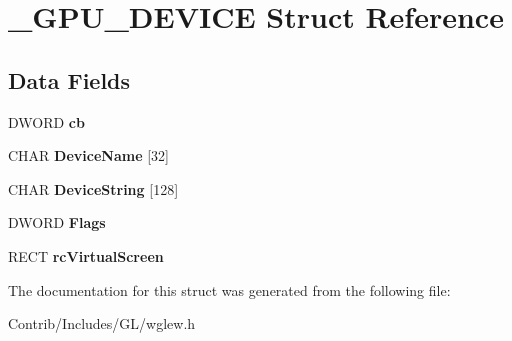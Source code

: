\hypertarget{struct___g_p_u___d_e_v_i_c_e}{}\section{\+\_\+\+G\+P\+U\+\_\+\+D\+E\+V\+I\+CE Struct Reference}
\label{struct___g_p_u___d_e_v_i_c_e}
\subsection*{Data Fields}
\begin{DoxyCompactItemize}
\item 
D\+W\+O\+RD {\bfseries cb}\hypertarget{struct___g_p_u___d_e_v_i_c_e_a9ed6a30359da8299f730bdf76bc44dbb}{}\label{struct___g_p_u___d_e_v_i_c_e_a9ed6a30359da8299f730bdf76bc44dbb}

\item 
C\+H\+AR {\bfseries Device\+Name} \mbox{[}32\mbox{]}\hypertarget{struct___g_p_u___d_e_v_i_c_e_ac69f96150a35681e29f6d5ec0ef8e922}{}\label{struct___g_p_u___d_e_v_i_c_e_ac69f96150a35681e29f6d5ec0ef8e922}

\item 
C\+H\+AR {\bfseries Device\+String} \mbox{[}128\mbox{]}\hypertarget{struct___g_p_u___d_e_v_i_c_e_a7ac253a8939110f67ef7ae04b8aff173}{}\label{struct___g_p_u___d_e_v_i_c_e_a7ac253a8939110f67ef7ae04b8aff173}

\item 
D\+W\+O\+RD {\bfseries Flags}\hypertarget{struct___g_p_u___d_e_v_i_c_e_acf89e83df8334708ce64a52c00795bf3}{}\label{struct___g_p_u___d_e_v_i_c_e_acf89e83df8334708ce64a52c00795bf3}

\item 
R\+E\+CT {\bfseries rc\+Virtual\+Screen}\hypertarget{struct___g_p_u___d_e_v_i_c_e_ad24baeca70564f5945ba9397adb68c50}{}\label{struct___g_p_u___d_e_v_i_c_e_ad24baeca70564f5945ba9397adb68c50}

\end{DoxyCompactItemize}


The documentation for this struct was generated from the following file\+:\begin{DoxyCompactItemize}
\item 
Contrib/\+Includes/\+G\+L/wglew.\+h\end{DoxyCompactItemize}
